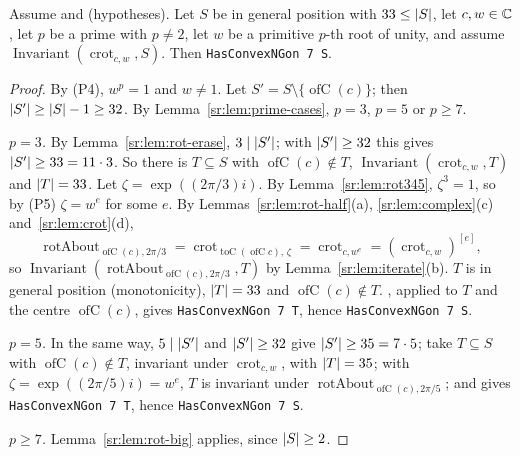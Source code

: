 \begin{lemma}\label{sr:lem:odd-prime}
Assume  and  (hypotheses). Let $S$ be in general position with $33\le\lvert S\rvert$, let
$c,w\in\mathbb C$, let $p$ be a prime with $p\ne2$, let $w$ be a primitive $p$-th root of unity, and assume
$\operatorname{Invariant}(\operatorname{crot}_{c,w},S)$. Then \texttt{HasConvexNGon 7 S}.
\end{lemma}

\begin{proof}
By (P4), $w^p=1$ and $w\ne1$. Let $S'=S\setminus\{\operatorname{ofC}(c)\}$; then $\lvert S'\rvert\ge\lvert S\rvert-1\ge32$. By
Lemma~\ref{sr:lem:prime-cases}, $p=3$, $p=5$ or $p\ge7$.

\emph{$p=3$.} By Lemma~\ref{sr:lem:rot-erase}, $3\mid\lvert S'\rvert$; with $\lvert S'\rvert\ge32$ this gives $\lvert S'\rvert\ge33=11\cdot3$.
So there is $T\subseteq S$ with $\operatorname{ofC}(c)\notin T$, $\operatorname{Invariant}(\operatorname{crot}_{c,w},T)$
and $\lvert T\rvert=33$. Let $\zeta=\exp((2\pi/3)i)$. By Lemma~\ref{sr:lem:rot345}, $\zeta^3=1$, so by (P5) $\zeta=w^e$ for
some $e$. By Lemmas~\ref{sr:lem:rot-half}(a), \ref{sr:lem:complex}(c) and~\ref{sr:lem:crot}(d),
\[
\operatorname{rotAbout}_{\operatorname{ofC}(c),2\pi/3}=\operatorname{crot}_{\operatorname{toC}(\operatorname{ofC}c),\,\zeta}
=\operatorname{crot}_{c,w^e}=(\operatorname{crot}_{c,w})^{[e]},
\]
so $\operatorname{Invariant}(\operatorname{rotAbout}_{\operatorname{ofC}(c),2\pi/3},T)$ by Lemma~\ref{sr:lem:iterate}(b).
$T$ is in general position (monotonicity), $\lvert T\rvert=33$ and $\operatorname{ofC}(c)\notin T$. , applied
to $T$ and the centre $\operatorname{ofC}(c)$, gives \texttt{HasConvexNGon 7 T}, hence \texttt{HasConvexNGon 7 S}.

\emph{$p=5$.} In the same way, $5\mid\lvert S'\rvert$ and $\lvert S'\rvert\ge32$ give $\lvert S'\rvert\ge35=7\cdot5$; take $T\subseteq S$
with $\operatorname{ofC}(c)\notin T$, invariant under $\operatorname{crot}_{c,w}$, with $\lvert T\rvert=35$; with
$\zeta=\exp((2\pi/5)i)=w^e$, $T$ is invariant under $\operatorname{rotAbout}_{\operatorname{ofC}(c),2\pi/5}$; and
 gives \texttt{HasConvexNGon 7 T}, hence \texttt{HasConvexNGon 7 S}.

\emph{$p\ge7$.} Lemma~\ref{sr:lem:rot-big} applies, since $\lvert S\rvert\ge2$.
\end{proof}

